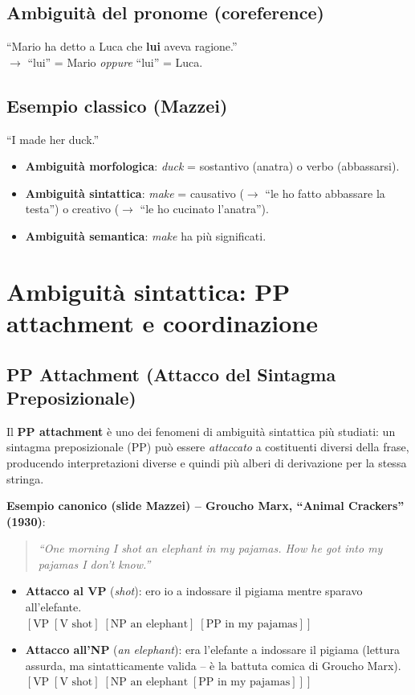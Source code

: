 \documentclass[12pt,a4paper]{article}
\begin{document}
\subsection{Ambiguità del pronome (coreference)}

``Mario ha detto a Luca che \textbf{lui} aveva ragione.''\\
$\to$ ``lui'' = Mario \emph{oppure} ``lui'' = Luca.

\subsection{Esempio classico (Mazzei)}

``I made her duck.''
\begin{itemize}[leftmargin=1.5em]
  \item \textbf{Ambiguità morfologica}: \textit{duck} = sostantivo (anatra) o verbo (abbassarsi).
  \item \textbf{Ambiguità sintattica}: \textit{make} = causativo ($\to$ ``le ho fatto abbassare la testa'') o creativo ($\to$ ``le ho cucinato l'anatra'').
  \item \textbf{Ambiguità semantica}: \textit{make} ha più significati.
\end{itemize}

\section{Ambiguità sintattica: PP attachment e coordinazione}

\subsection{PP Attachment (Attacco del Sintagma Preposizionale)}

Il \textbf{PP attachment} è uno dei fenomeni di ambiguità sintattica più studiati: un sintagma preposizionale (PP) può essere \emph{attaccato} a costituenti diversi della frase, producendo interpretazioni diverse e quindi più alberi di derivazione per la stessa stringa.

\textbf{Esempio canonico (slide Mazzei) -- Groucho Marx, ``Animal Crackers'' (1930)}:
\begin{quote}
\textit{``One morning I shot an elephant in my pajamas. How he got into my pajamas I don't know.''}
\end{quote}
\begin{itemize}[leftmargin=1.5em]
  \item \textbf{Attacco al VP} (\textit{shot}): ero io a indossare il pigiama mentre sparavo all'elefante. \\
    $[\text{VP}\;[\text{V shot}]\;[\text{NP an elephant}]\;[\text{PP in my pajamas}]]$
  \item \textbf{Attacco all'NP} (\textit{an elephant}): era l'elefante a indossare il pigiama (lettura assurda, ma sintatticamente valida -- è la battuta comica di Groucho Marx). \\
    $[\text{VP}\;[\text{V shot}]\;[\text{NP an elephant}\;[\text{PP in my pajamas}]]]$
\end{itemize}
\end{document}
